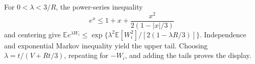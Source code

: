 For \(0<\lambda<3/R\), the power-series inequality
\[
e^x\le1+x+\frac{x^2}{2(1-\lvert x\rvert/3)}
\]
and centering give \(\mathbb E e^{\lambda W_i}\le\exp\{\lambda^2\mathbb E[W_i^2]/[2(1-\lambda R/3)]\}\). Independence and exponential Markov inequality yield the upper tail. Choosing \(\lambda=t/(V+Rt/3)\), repeating for \(-W_i\), and adding the tails proves the display.